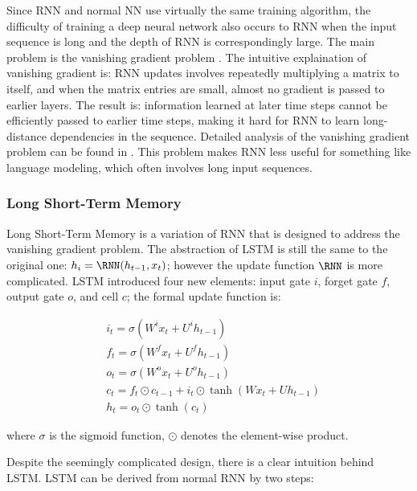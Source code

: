 Since RNN and normal NN use virtually the same training algorithm, the difficulty of training a deep neural network also occurs to RNN when the input sequence is long and the depth of RNN is correspondingly large. The main problem is the vanishing gradient problem \cite{hochreiter1991untersuchungen,hochreiter2001gradient}. The intuitive explaination of vanishing gradient is: RNN updates involves repeatedly multiplying a matrix to itself, and when the matrix entries are small, almost no gradient is passed to earlier layers. The result is: information learned at later time steps cannot be efficiently passed to earlier time steps, making it hard for RNN to learn long-distance dependencies in the sequence. Detailed analysis of the vanishing gradient problem can be found in \cite{pascanu2013on}. This problem makes RNN less useful for something like language modeling, which often involves long input sequences.

\subsubsection{Long Short-Term Memory}

Long Short-Term Memory \cite{hochreiter1997long} is a variation of RNN that is designed to address the vanishing gradient problem. The abstraction of LSTM is still the same to the original one: $h_i=\RNN(h_{t-1}, x_t)$; however the update function $\RNN$ is more complicated. LSTM introduced four new elements: input gate $i$, forget gate $f$, output gate $o$, and cell $c$; the formal update function is:

\begin{align*}
& i_t = \sigma(W^i x_t + U^i h_{t-1}) \\
& f_t = \sigma(W^f x_t + U^f h_{t-1}) \\
& o_t = \sigma(W^o x_t + U^o h_{t-1}) \\
& c_t = f_t \odot c_{t-1} + i_t \odot \tanh(Wx_t + Uh_{t-1}) \\
& h_t = o_t \odot \tanh(c_t)
\end{align*}

where $\sigma$ is the sigmoid function, $\odot$ denotes the element-wise product.

Despite the seemingly complicated design, there is a clear intuition behind LSTM. LSTM can be derived from normal RNN by two steps:

